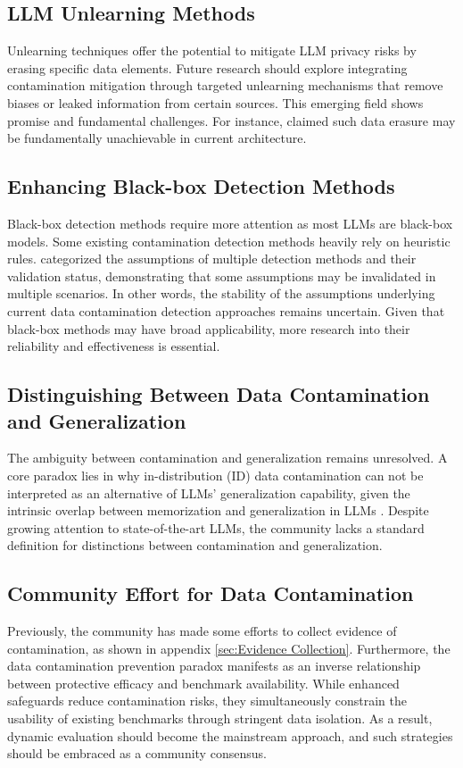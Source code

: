\label{sec:future directions}
\subsection{LLM Unlearning Methods}
Unlearning techniques offer the potential to mitigate LLM privacy risks by erasing specific data elements. Future research should explore integrating contamination mitigation through targeted unlearning mechanisms that remove biases or leaked information from certain sources. This emerging field shows promise and fundamental challenges. For instance, \citet{shumailov2024ununlearning} claimed such data erasure may be fundamentally unachievable in current architecture.

\subsection{Enhancing Black-box Detection Methods}
Black-box detection methods require more attention as most LLMs are black-box models. Some existing contamination detection methods heavily rely on heuristic rules. \citet{fu2024does} categorized the assumptions of multiple detection methods and their validation status, demonstrating that some assumptions may be invalidated in multiple scenarios. In other words, the stability of the assumptions underlying current data contamination detection approaches remains uncertain. Given that black-box methods may have broad applicability, more research into their reliability and effectiveness is essential.
 
\subsection{Distinguishing Between Data Contamination and Generalization}
The ambiguity between contamination and generalization remains unresolved. A core paradox lies in why in-distribution (ID) data contamination can not be interpreted as an alternative of LLMs' generalization capability, given the intrinsic overlap between memorization and generalization in LLMs \cite{zhang2021understanding}. Despite growing attention to state-of-the-art LLMs, the community lacks a standard definition for distinctions between contamination and generalization.

\subsection{Community Effort for Data Contamination}
Previously, the community has made some efforts to collect evidence of contamination, as shown in appendix \ref{sec:Evidence Collection}. Furthermore, the data contamination prevention paradox manifests as an inverse relationship between protective efficacy and benchmark availability. While enhanced safeguards reduce contamination risks, they simultaneously constrain the usability of existing benchmarks through stringent data isolation. As a result, dynamic evaluation should become the mainstream approach, and such strategies should be embraced as a community consensus.

